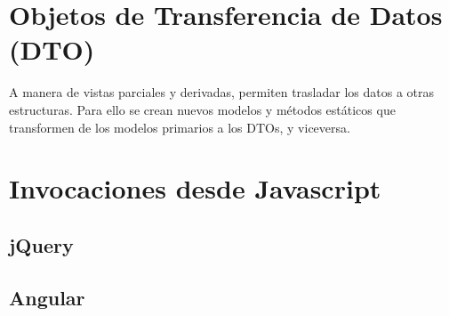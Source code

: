 \documentclass[11pt]{article} %
\begin{document}
\section{Objetos de Transferencia de Datos (DTO)}
A manera de vistas parciales y derivadas, permiten trasladar los datos a otras estructuras. Para ello se crean nuevos modelos y métodos estáticos que transformen de los modelos primarios a los DTOs, y viceversa.

\section{Invocaciones desde Javascript}
\subsection{jQuery}
\subsection{Angular}
\end{document}
